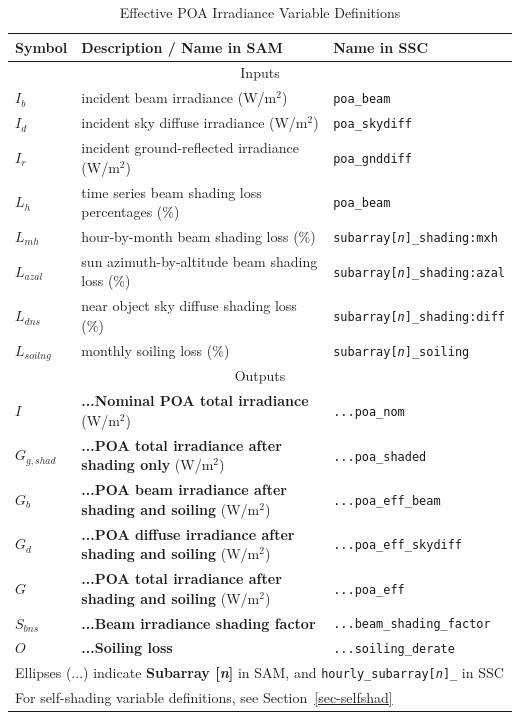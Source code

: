 \documentclass[12pt,letterpaper]{article}
\begin{document}
\begin{table}
\begin{center}
\caption{Effective POA Irradiance Variable Definitions}
\begin{tabular}{lll}
\midrule
Symbol & Description / \textbf{Name in SAM} & Name in SSC\\
\midrule
\multicolumn{3}{c}{Inputs}\\
$I_b$ & incident beam irradiance (W/m$^2$)  & \texttt{poa\_beam}\\
$I_d$ & incident sky diffuse irradiance (W/m$^2$)& \texttt{poa\_skydiff}\\
$I_r$ & incident ground-reflected irradiance (W/m$^2$)& \texttt{poa\_gnddiff}\\
$L_h$ & time series beam shading loss percentages (\%) & \texttt{poa\_beam}\\
$L_{mh}$ & hour-by-month beam shading loss (\%)& \texttt{subarray[\textit{n}]\_shading:mxh}\\
$L_{azal}$ & sun azimuth-by-altitude beam shading loss  (\%)& \texttt{subarray[\textit{n}]\_shading:azal}\\
$L_{dns}$ & near object sky diffuse shading loss (\%)  & \texttt{subarray[\textit{n}]\_shading:diff}\\
$L_{soilng}$ & monthly soiling loss (\%)  & \texttt{subarray[\textit{n}]\_soiling}\\
\midrule
\multicolumn{3}{c}{Outputs}\\
$I$ & \textbf{...Nominal POA total irradiance} (W/m$^2$)& \texttt{...poa\_nom}\\
$G_{g,shad}$ & \textbf{...POA total irradiance after shading only} (W/m$^2$)& \texttt{...poa\_shaded}\\
$G_b$ & \textbf{...POA beam irradiance after shading and soiling} (W/m$^2$)& \texttt{...poa\_eff\_beam}\\
$G_d$ & \textbf{...POA diffuse irradiance after shading and soiling} (W/m$^2$)& \texttt{...poa\_eff\_skydiff}\\
$G$ & \textbf{...POA total irradiance after shading and soiling} (W/m$^2$)& \texttt{...poa\_eff}\\
$S_{bns}$ & \textbf{...Beam irradiance shading factor} & \texttt{...beam\_shading\_factor}\\
$O$ & \textbf{...Soiling loss} & \texttt{...soiling\_derate}\\
\midrule
\multicolumn{3}{l}{Ellipses (...) indicate \textbf{Subarray [\textit{n}]} in SAM, and \texttt{hourly\_subarray[\textit{n}]\_} in SSC}\\
\multicolumn{3}{l}{For self-shading variable definitions, see Section~\ref{sec-selfshad}}\\
\end{tabular}
\label{tab-effectiveirradiancevars}
\end{center}
\end{table}
\end{document}
